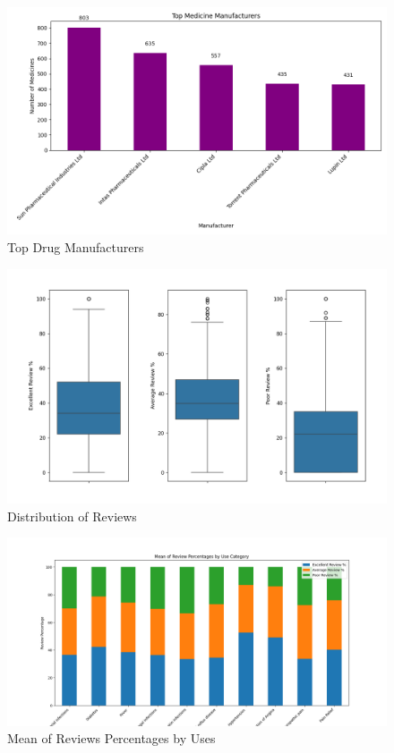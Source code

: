 \documentclass[sigconf]{acmart}
\begin{document}
\begin{figure}[H]
	\centering
	\includegraphics[width=\linewidth]{graphic1.png}
	\caption{Top Drug Manufacturers}
	\label{fig:topManufacturers}
  \end{figure}

\begin{figure}[H]
	\centering
	\includegraphics[width=\linewidth]{graphic2.png}
	\caption{Distribution of Reviews}
	\label{fig:reviewDistribution}
  \end{figure}

\begin{figure}[H]
	\centering
	\includegraphics[width=\linewidth]{graphic3.png}
	\caption{Mean of Reviews Percentages by Uses}
	\label{fig:reviewPercMean}
  \end{figure}
\end{document}

